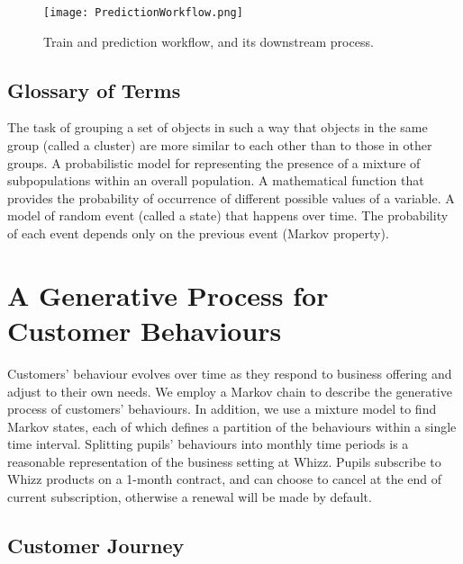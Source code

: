 \documentclass[english,a4,oneside,9pt]{extarticle}
\begin{document}
\begin{figure}[htb]
\centering
\texttt{[image: PredictionWorkflow.png]}
\caption{Train and prediction workflow, and its downstream process.}
\label{fig:workflow}
\end{figure} 

\subsection*{Glossary of Terms}

\begin{infommitemize}
	 The task of grouping a set of objects in such a way that objects in the same group (called a cluster) are more similar to each other than to those in other groups.
	 A probabilistic model for representing the presence of a mixture of subpopulations within an overall population.
	 A mathematical function that provides the probability of occurrence of different possible values of a variable.
	 A model of random event (called a state) that happens over time. The probability of each event depends only on the previous event (Markov property).
\end{infommitemize}

\section{A Generative Process for Customer Behaviours}

Customers' behaviour evolves over time as they respond to business offering and adjust to their own needs. We employ a Markov chain to describe the generative process of customers' behaviours. In addition, we use a mixture model to find Markov states, each of which defines a partition of the behaviours within a single time interval. Splitting pupils' behaviours into monthly time periods is a reasonable representation of the business setting at Whizz. Pupils subscribe to Whizz products on a 1-month contract, and can choose to cancel at the end of current subscription, otherwise a renewal will be made by default.

\subsection*{Customer Journey}

\end{document}
